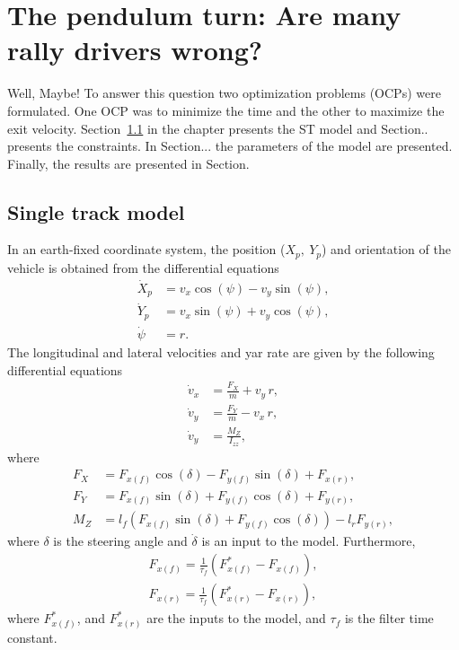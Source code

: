 \chapter[PEP: Pundilum Turn]{The pendulum turn: Are many rally drivers wrong?}

Well, Maybe! To answer this question two optimization problems (OCPs) were formulated. One OCP was to minimize the time and the other to maximize the exit velocity. Section~\ref{sec:STM} in the chapter presents the ST model and Section.. presents the constraints. In Section... the parameters of the model are presented. Finally, the results are presented in Section.

\section[ST model]{Single track model}\label{sec:STM}
In an earth-fixed coordinate system, the position ($X_p,\ Y_p$) and orientation of the vehicle is obtained from the differential equations
\begin{subequations}
    \begin{align}
        \dot X_p &= v_x\cos\left(\psi\right) - v_y\sin\left(\psi\right), \\
        \dot Y_p &= v_x\sin\left(\psi\right) + v_y\cos\left(\psi\right), \\
        \dot \psi &= r.
    \end{align}
\end{subequations}
The longitudinal and lateral velocities and yar rate are given by the following differential equations 
\begin{subequations}
    \begin{align}
        \dot v_x &= \frac{F_X}{m} + v_y\,r,\\
        \dot v_y &= \frac{F_Y}{m} - v_x\,r,\\
        \dot v_y &= \frac{M_Z}{I_{zz}},
    \end{align}
\end{subequations}
where 
\begin{subequations}
    \begin{align}
        F_X &= F_{x(f)}\cos\left(\delta\right) - F_{y(f)}\sin\left(\delta\right) + F_{x(r)},\\
        F_Y &= F_{x(f)}\sin\left(\delta\right) + F_{y(f)}\cos\left(\delta\right) + F_{y(r)},\\
        M_Z &= l_f\left(F_{x(f)}\sin\left(\delta\right) + F_{y(f)}\cos\left(\delta\right)\right) - l_rF_{y(r)},
    \end{align}
\end{subequations}
where $\delta$ is the steering angle and $\dot \delta$ is an input to the model. Furthermore, 
\begin{subequations}
    \begin{align}
        F_{x(f)} = \frac{1}{\tau_f}\left(F_{x(f)}^* - F_{x(f)}\right),\\
        F_{x(r)} = \frac{1}{\tau_f}\left(F_{x(r)}^* - F_{x(r)}\right),
    \end{align}
\end{subequations}
where $F_{x(f)}^*$, and $F_{x(r)}^*$ are the inputs to the model, and $\tau_f$ is the filter time constant. 

